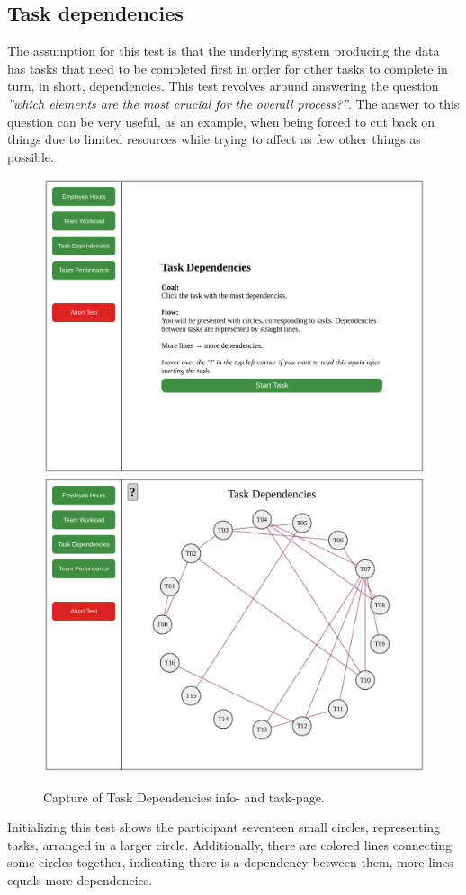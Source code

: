{  \subsection{Task dependencies}

    \textit{\ideaThree}

    The assumption for this test is that the underlying system producing
    the data has tasks that need to be completed first in order for other
    tasks to complete in turn, in short, dependencies. This test revolves
    around answering the question
    \textit{''which elements are the most crucial for the overall
      process?''}. The answer to this question can be very useful, as an
    example, when being forced to cut back on things due to limited
    resources while trying to affect as few other things as possible.

    \begin{figure}[h!]
      \centering
      \includegraphics[width=.49\textwidth]{figures/captures/webapp_dependencies_info.pdf}
      \includegraphics[width=.49\textwidth]{figures/captures/webapp_dependencies_task.pdf}
      \caption{Capture of Task Dependencies info- and task-page.}
    \end{figure}

    Initializing this test shows the participant seventeen small circles,
    representing tasks, arranged in a larger circle. Additionally, there are
    colored lines connecting some circles together, indicating there is
    a dependency between them, more lines equals more dependencies.

}
